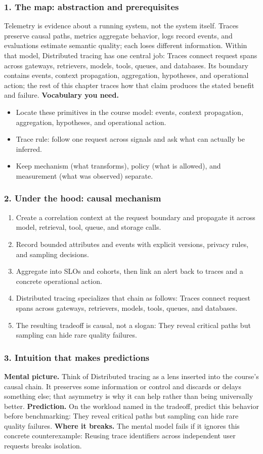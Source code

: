 \subsubsection*{1. The map: abstraction and prerequisites}
Telemetry is evidence about a running system, not the system itself. Traces preserve causal paths, metrics aggregate behavior, logs record events, and evaluations estimate semantic quality; each loses different information.
Within that model, Distributed tracing has one central job: Traces connect request spans across gateways, retrievers, models, tools, queues, and databases. Its boundary contains events, context propagation, aggregation, hypotheses, and operational action; the rest of this chapter traces how that claim produces the stated benefit and failure.
\textbf{Vocabulary you need.}\begin{itemize}
\item Locate these primitives in the course model: events, context propagation, aggregation, hypotheses, and operational action.
\item Trace rule: follow one request across signals and ask what can actually be inferred.
\item Keep mechanism (what transforms), policy (what is allowed), and measurement (what was observed) separate.
\end{itemize}
\subsubsection*{2. Under the hood: causal mechanism}\begin{enumerate}
\item Create a correlation context at the request boundary and propagate it across model, retrieval, tool, queue, and storage calls.
\item Record bounded attributes and events with explicit versions, privacy rules, and sampling decisions.
\item Aggregate into SLOs and cohorts, then link an alert back to traces and a concrete operational action.
\item Distributed tracing specializes that chain as follows: Traces connect request spans across gateways, retrievers, models, tools, queues, and databases.
\item The resulting tradeoff is causal, not a slogan: They reveal critical paths but sampling can hide rare quality failures.
\end{enumerate}
\subsubsection*{3. Intuition that makes predictions}
\textbf{Mental picture.} Think of Distributed tracing as a lens inserted into the course's causal chain. It preserves some information or control and discards or delays something else; that asymmetry is why it can help rather than being universally better.
\textbf{Prediction.} On the workload named in the tradeoff, predict this behavior before benchmarking: They reveal critical paths but sampling can hide rare quality failures.
\textbf{Where it breaks.} The mental model fails if it ignores this concrete counterexample: Reusing trace identifiers across independent user requests breaks isolation.
